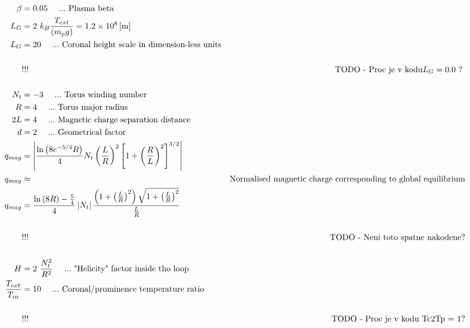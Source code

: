 \begin{align}
\beta & =  0.05\ \ \ \ ...\ \text{Plasma beta}\\
L_G & =  2\ k_B \frac{T_{ext}}{\lo m_p g \ro} = 1.2 \times 10^8 \left[\text{m}\right]\\
L_G & =  20 \ \ \ \ ...\ \text{Coronal height scale in dimension-less units}\\
\\
& !!! & \text{TODO - Proc je v kodu} L_G = 0.0 \ ?\
\\ \\
N_t & = -3\ \ \ \ ...\ \text{Torus winding number}\\
R & = 4\ \ \ \ ...\ \text{Torus major radius}\\
2L & =  4\ \ \ \ ...\ \text{Magnetic charge separation distance}\\
d & =  2\ \ \ \ ...\ \text{Geometrical factor}\\
q_{mag} & =  \left| \frac{\ln\lo 8 e^{-5/4} R\ro}{4} N_t \lo\frac{L}{R}\ro^2\left[1 + \lo\frac{R}{L}\ro^2\right]^{3/2}\right|\\
q_{mag} & \approx & \text{Normalised magnetic charge corresponding to global equilibrium}\\
q_{mag} & =  \frac{ \ln\lo 8R \ro - \frac{5}{4}}{4} \left| N_t \right| \frac{\lo 1 + \lo\frac{L}{R}\ro^2\ro \sqrt{1 + \lo\frac{L}{R}\ro^2}}{\frac{L}{R}}\\
\\
& !!! & \text{TODO - Neni toto spatne nakodene?}
\\\ \\
H & =  2\ \frac{N_t^2}{R^2}\ \ \ \ ...\ \text{"Helicity" factor inside tho loop}\\
\frac{ T_{ext} }{T_{in}} & =  10\ \ \ \ ...\ \text{Coronal/prominence temperature ratio}\\
\\
& !!! & \text{TODO - Proc je v kodu Tc2Tp = 1?}
\\\ \\
\end{align}